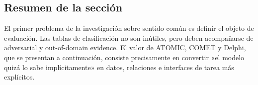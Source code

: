 \subsection{Resumen de la sección}

El primer problema de la investigación sobre sentido común es definir el objeto de evaluación. Las tablas de clasificación no son inútiles, pero deben acompañarse de adversarial y out-of-domain evidence. El valor de ATOMIC, COMET y Delphi, que se presentan a continuación, consiste precisamente en convertir «el modelo quizá lo sabe implícitamente» en datos, relaciones e interfaces de tarea más explícitos.
